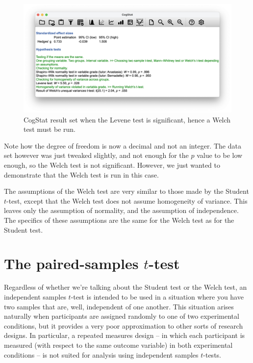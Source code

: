\documentclass[
]{book}
\theoremstyle{definition}
\theoremstyle{definition}
\theoremstyle{definition}
\theoremstyle{definition}
\theoremstyle{remark}
\begin{document}
\begin{figure}

{\centering \includegraphics[width=0.66\linewidth]{resources/image/cogstatharpowelch} 

}

\caption{CogStat result set when the Levene test is significant, hence a Welch test must be run.}\label{fig:harpowelch}
\end{figure}

Note how the degree of freedom is now a decimal and not an integer. The data set however was just tweaked slightly, and not enough for the \(p\) value to be low enough, so the Welch test is not significant. However, we just wanted to demonstrate that the Welch test is run in this case.

The assumptions of the Welch test are very similar to those made by the Student \(t\)-test, except that the Welch test does not assume homogeneity of variance. This leaves only the assumption of normality, and the assumption of independence. The specifics of these assumptions are the same for the Welch test as for the Student test.

\hypertarget{pairedsamplesttest}{%
\section{\texorpdfstring{The paired-samples \(t\)-test}{The paired-samples t-test}}\label{pairedsamplesttest}}

Regardless of whether we're talking about the Student test or the Welch test, an independent samples \(t\)-test is intended to be used in a situation where you have two samples that are, well, independent of one another. This situation arises naturally when participants are assigned randomly to one of two experimental conditions, but it provides a very poor approximation to other sorts of research designs. In particular, a repeated measures design -- in which each participant is measured (with respect to the same outcome variable) in both experimental conditions -- is not suited for analysis using independent samples \(t\)-tests.
\end{document}
